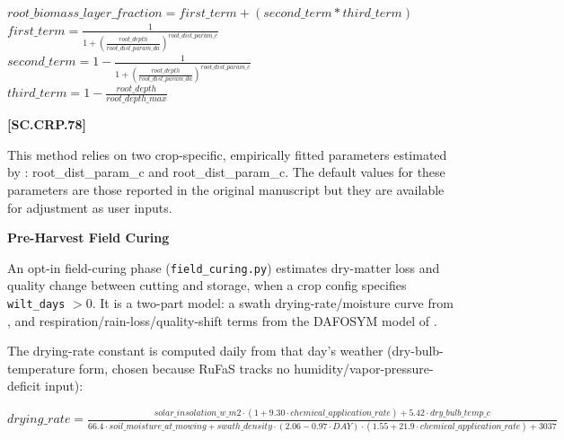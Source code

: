     \begin{center}
        \(root\_biomass\_layer\_fraction=first\_term + (second\_term * third\_term) \)\\ 
    \(first\_term= \frac{1}{1+(\frac{root\_depth}{root\_dist\_param\_da})^{root\_dist\_param\_c}}\) \\
    \(second\_term= 1 - \frac{1}{1+(\frac{root\_depth}{root\_dist\_param\_da})^{root\_dist\_param\_c}}\) \\
    \(third\_term= 1 - \frac{root\_depth}{root\_depth\_max}\) \\
    \end{center}
        \vspace{0.5cm}
    
            {\raggedleft \textbf{[SC.CRP.78]}\par}
            \vspace{0.5cm}

This method relies on two crop-specific, empirically fitted parameters estimated by \cite{fan2016root}: root\_dist\_param\_c and root\_dist\_param\_c. The default values for these parameters are those reported in the original manuscript but they are available for adjustment as user inputs. 




\textbf{Pre-Harvest Field Curing}
\vspace{0.2cm}

An opt-in field-curing phase (\texttt{field\_curing.py}) estimates dry-matter loss and quality change between cutting and storage, when a crop config specifies \texttt{wilt\_days} $>0$. It is a two-part model: a swath drying-rate/moisture curve from \cite{rotzchen1985}, and respiration/rain-loss/quality-shift terms from the DAFOSYM model of \cite{rotzblackmertensbuckmaster1989}.

The drying-rate constant is computed daily from that day's weather (dry-bulb-temperature form, chosen because RuFaS tracks no humidity/vapor-pressure-deficit input):
   \vspace{0.2cm}

    \begin{center}
        \(drying\_rate= \frac{solar\_insolation\_w\_m2 \cdot (1+9.30 \cdot chemical\_application\_rate) + 5.42 \cdot dry\_bulb\_temp\_c}{66.4 \cdot soil\_moisture\_at\_mowing + swath\_density \cdot (2.06-0.97 \cdot DAY) \cdot (1.55+21.9 \cdot chemical\_application\_rate) + 3037}\)
    \end{center}
        \vspace{0.5cm}

